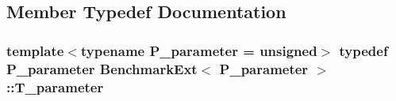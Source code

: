 \subsection{Member Typedef Documentation}
\hypertarget{classBenchmarkExt_a8b17d300898ee83a0c10463c1b53cfa5}{}
\subsubsection[{T\+\_\+parameter}]{\setlength{\rightskip}{0pt plus 5cm}template$<$typename P\+\_\+parameter  = unsigned$>$ typedef P\+\_\+parameter {\bf Benchmark\+Ext}$<$ P\+\_\+parameter $>$\+::{\bf T\+\_\+parameter}}\label{classBenchmarkExt_a8b17d300898ee83a0c10463c1b53cfa5}


